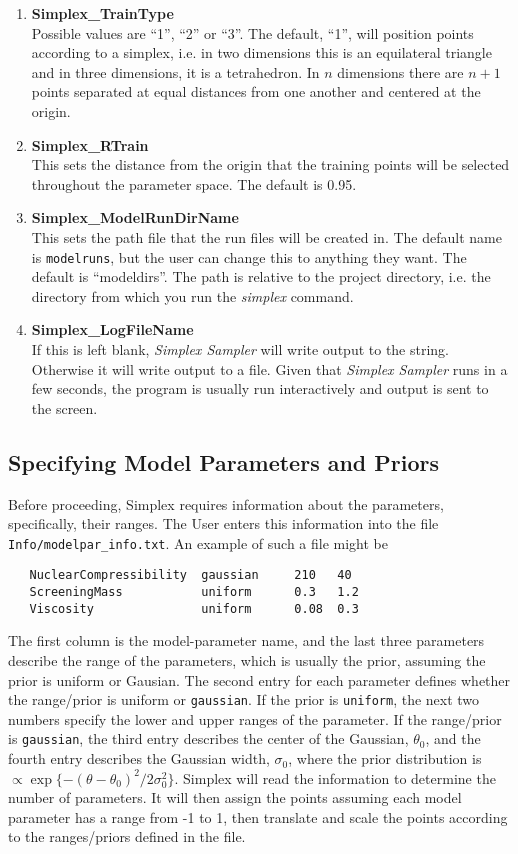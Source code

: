 \documentclass[UserManual.tex]{subfiles}
\begin{document}
\begin{enumerate}\itemsep 0pt
    \item {\bf Simplex\_TrainType}\\
Possible values are ``1'', ``2'' or ``3''. The default, ``1'', will position points according to a simplex, i.e. in two dimensions this is an equilateral triangle and in three dimensions, it is a tetrahedron. In $n$ dimensions there are $n+1$ points separated at equal distances from one another and centered at the origin. 
\item {\bf Simplex\_RTrain}\\
This sets the distance from the origin that the training points will be selected throughout the parameter space. The default is 0.95.
\item {\bf Simplex\_ModelRunDirName}\\
This sets the path file that the run files will be created in. The default name is {\tt{modelruns}}, but the user can change this to anything they want. The default is ``modeldirs''. The path is relative to the project directory, i.e. the directory from which you run the {\it simplex} command.
\item {\bf Simplex\_LogFileName}\\
If this is left blank, {\it Simplex Sampler} will write output to the string. Otherwise it will write output to a file. Given that {\it Simplex Sampler} runs in a few seconds, the program is usually run interactively and output is sent to the screen.
\end{enumerate}

\subsection{Specifying Model Parameters and Priors}\label{subsec:modelparinfo}
Before proceeding, Simplex requires information about the parameters, specifically, their ranges. The User enters this information into the file {\tt Info/modelpar\_info.txt}. An example of such a file might be
{\tt\begin{verbatim}
   NuclearCompressibility  gaussian     210   40
   ScreeningMass           uniform      0.3   1.2
   Viscosity               uniform      0.08  0.3
\end{verbatim}
}
The first column is the model-parameter name, and the last three parameters describe the range of the parameters, which is usually the prior, assuming the prior is uniform or Gausian. The second entry for each parameter defines whether the range/prior is uniform or {\tt gaussian}. If the prior is {\tt uniform}, the next two numbers specify the lower and upper ranges of the parameter. If the range/prior is {\tt gaussian}, the third entry describes the center of the Gaussian, $\theta_0$, and the fourth entry describes the Gaussian width, $\sigma_0$, where the prior distribution is $\propto \exp\{-(\theta-\theta_0)^2/2\sigma_0^2\}$. Simplex will read the information to determine the number of parameters. It will then assign the points assuming each model parameter has a range from -1 to 1, then translate and scale the points according to the ranges/priors defined in the file.
\end{document}
